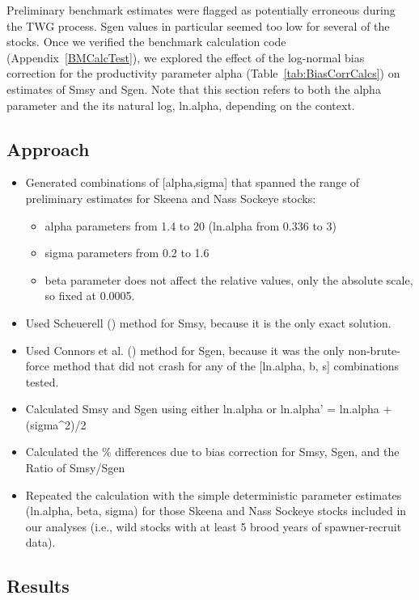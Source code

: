 \documentclass[french,11pt]{book}
\begin{document}
Preliminary benchmark estimates were flagged as potentially erroneous during the TWG process. Sgen values in particular seemed too low for several of the stocks. Once we verified the benchmark calculation code (Appendix~\ref{BMCalcTest}), we explored the effect of the log-normal bias correction for the productivity parameter alpha (Table~\ref{tab:BiasCorrCalcs}) on estimates of Smsy and Sgen. Note that this section refers to both the alpha parameter and the its natural log, ln.alpha, depending on the context.

\subsection{Approach}\label{approach}
\begin{itemize}

\item
  Generated combinations of {[}alpha,sigma{]} that spanned the range of preliminary estimates for Skeena and Nass Sockeye stocks:
  \begin{itemize}

  \item
    alpha parameters from 1.4 to 20 (ln.alpha from 0.336 to 3)
  \item
    sigma parameters from 0.2 to 1.6
  \item
    beta parameter does not affect the relative values, only the absolute scale, so fixed at 0.0005.
  \end{itemize}
\item
  Used Scheuerell () method for Smsy, because it is the only exact solution.
\item
  Used Connors et al. () method for Sgen, because it was the only non-brute-force method that did not crash for any of the {[}ln.alpha, b, s{]} combinations tested.
\item
  Calculated Smsy and Sgen using either ln.alpha or ln.alpha' = ln.alpha + (sigma\^{}2)/2
\item
  Calculated the \% differences due to bias correction for Smsy, Sgen, and the Ratio of Smsy/Sgen
\item
  Repeated the calculation with the simple deterministic parameter estimates (ln.alpha, beta, sigma) for those Skeena and Nass Sockeye stocks included in our analyses (i.e., wild stocks with at least 5 brood years of spawner-recruit data).
\end{itemize}
\subsection{Results}\label{results-5}
\end{document}
